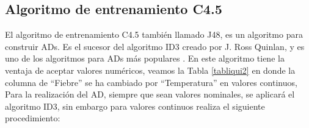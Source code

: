 \documentclass[twoside,spanish,ESP,MSc]{plantillaLabUPV}
\theoremstyle{definition}
\begin{document}
\subsection{Algoritmo de entrenamiento C4.5}

El algoritmo de entrenamiento C4.5 también llamado J48, es un algoritmo para construir ADs. Es el sucesor del algoritmo ID3 creado por J. Ross Quinlan, y es uno de los algoritmos para ADs más populares \cite{c45salz}. 
En este algoritmo tiene la ventaja de aceptar valores numéricos, veamos la Tabla \ref{tabliqui2} en donde la columna de ``Fiebre'' se ha cambiado por ``Temperatura'' en valores continuos, Para la realización del AD, siempre que sean valores nominales, se aplicará el algoritmo ID3, sin embargo para valores continuos realiza el siguiente procedimiento:
\end{document}
